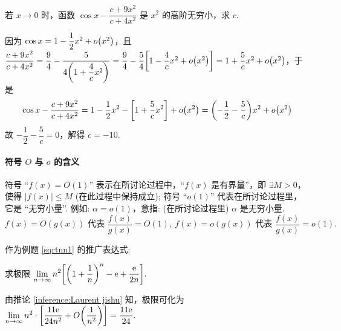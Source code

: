 \begin{example}
    若 $x\to0$ 时，函数 $\cos x-\dfrac{c+9x^2}{c+4x^2}$ 是 $x^2$ 的高阶无穷小，求 $c$.
\end{example}
\begin{solution}
    因为 $\cos x=1-\dfrac{1}{2}x^2+o\qty(x^2)$，且 $\dfrac{c+9x^2}{c+4x^2}=\dfrac{9}{4}-\dfrac{5}{4\qty(1+\dfrac{4}{c}x^2)}=\dfrac{9}{4}-\dfrac{5}{4}\qty[1-\dfrac{4}{c}x^2+o\qty(x^2)]=1+\dfrac{5}{c}x^2+o\qty(x^2)$，于是
    $$\cos x-\dfrac{c+9x^2}{c+4x^2}=1-\dfrac{1}{2}x^2-\qty[1+\dfrac{5}{c}x^2]+o\qty(x^2)=\qty(-\dfrac{1}{2}-\dfrac{5}{c})x^2+o\qty(x^2)$$
    故 $-\dfrac{1}{2}-\dfrac{5}{c}=0$，解得 $c=-10.$
\end{solution}

\paragraph{符号 $O$ 与 $o$ 的含义}
符号 “$f(x)=O(1)$” 表示在所讨论过程中，“$f(x) $ 是有界量”，即 $ \exists M>0$，使得 $ |f(x)| \leqslant M $ (在此过程中保持成立);
符号 “$o(1)$” 代表在所讨论过程里，它是 “无穷小量”. 例如: $ \alpha=o(1) $，意指: (在所讨论过程里) $\alpha $ 是无穷小量.
$$f(x)=O(g(x)) \text{ 代表 } \dfrac{f(x)}{g(x)}=O(1),~f(x)=o(g(x))\text{ 代表 }\dfrac{f(x)}{g(x)}=o(1).$$

\begin{inference}[Laurent  级数]\label{inference:Laurent jishu}
    作为例题 \ref{sqrtnn1} 的推广表达式:
\end{inference}

\begin{example}
    求极限 $\displaystyle\lim_{n\to\infty}n^2\qty[\qty(1+\dfrac{1}{n})^n-\mathrm{e}+\dfrac{\mathrm{e}}{2n}].$
\end{example}
\begin{solution}
    由推论 \ref{inference:Laurent jishu} 知，极限可化为 $\displaystyle\lim_{n\to\infty}n^2\cdot\qty[\dfrac{11\mathrm{e}}{24n^2}+O\qty(\dfrac{1}{n^2})]=\dfrac{11\mathrm{e}}{24}.$
\end{solution}

